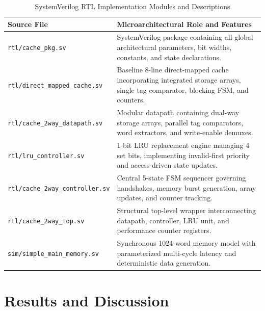 \documentclass[conference]{IEEEtran}
\begin{document}
\begin{table}[htbp]
\caption{SystemVerilog RTL Implementation Modules and Descriptions}
\label{tab:rtl_modules}
\centering
\begin{tabularx}{\columnwidth}{lX}
\toprule
\textbf{Source File} & \textbf{Microarchitectural Role and Features} \\
\midrule
\texttt{rtl/cache\_pkg.sv} & SystemVerilog package containing all global architectural parameters, bit widths, constants, and state declarations. \\
\addlinespace[0.3em]
\texttt{rtl/direct\_mapped\_cache.sv} & Baseline 8-line direct-mapped cache incorporating integrated storage arrays, single tag comparator, blocking FSM, and counters. \\
\addlinespace[0.3em]
\texttt{rtl/cache\_2way\_datapath.sv} & Modular datapath containing dual-way storage arrays, parallel tag comparators, word extractors, and write-enable demuxes. \\
\addlinespace[0.3em]
\texttt{rtl/lru\_controller.sv} & 1-bit LRU replacement engine managing 4 set bits, implementing invalid-first priority and access-driven state updates. \\
\addlinespace[0.3em]
\texttt{rtl/cache\_2way\_controller.sv} & Central 5-state FSM sequencer governing handshakes, memory burst generation, array updates, and counter tracking. \\
\addlinespace[0.3em]
\texttt{rtl/cache\_2way\_top.sv} & Structural top-level wrapper interconnecting datapath, controller, LRU unit, and performance counter registers. \\
\addlinespace[0.3em]
\texttt{sim/simple\_main\_memory.sv} & Synchronous 1024-word memory model with parameterized multi-cycle latency and deterministic data generation. \\
\bottomrule
\end{tabularx}
\end{table}

\section{Results and Discussion}
\label{sec:experiments}
\end{document}
